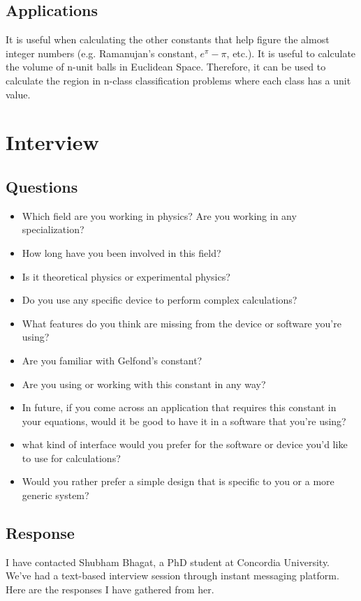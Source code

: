 \documentclass{article}
\begin{document}
\subsection{Applications}
\begin{flushleft}
\justifying
It is useful when calculating the other constants that help figure the almost integer numbers (e.g. Ramanujan's constant, $e^{\pi} - \pi$, etc.). It is useful to calculate the volume of n-unit balls \cite{nball} in Euclidean Space. Therefore, it can be used to calculate the region in n-class classification problems where each class has a unit value. 
\end{flushleft}

\section{Interview}

\subsection{Questions}
\justifying
\begin{itemize}
    \item Which field are you working in physics? Are you working in any specialization?
    \item How long have you been involved in this field?
    \item Is it theoretical physics or experimental physics?
    \item Do you use any specific device to perform complex calculations?
    \item What features do you think are missing from the device or software you're using?
    \item Are you familiar with Gelfond's constant?
    \item Are you using or working with this constant in any way?
    \item In future, if you come across an application that requires this constant in your equations, would it be good to have it in a software that you're using?
    \item what kind of interface would you prefer for the software or device you'd like to use for calculations?
    \item Would you rather prefer a simple design that is specific to you or a more generic system?
\end{itemize}

\subsection{Response}
\justifying
I have contacted Shubham Bhagat, a PhD student at Concordia University. We've had a text-based interview session through instant messaging platform. Here are the responses I have gathered from her.
\end{document}
